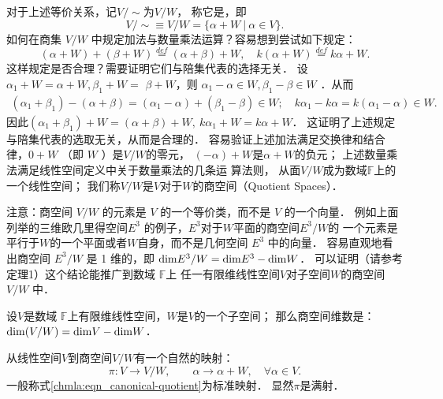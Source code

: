 对于上述等价关系，记$V / \sim$为$V / W$，
称它是，即
\begin{equation}\label{chmla:eqn_Quotient}
    V / \sim \equiv V / W=\{\alpha+W \ |\ \alpha \in V \} .
\end{equation}
如何在商集 $V / W$ 中规定加法与数量乘法运算？容易想到尝试如下规定：
\begin{equation}\label{chmla:eqn_abwlin}
    (\alpha+W)+(\beta+W) \stackrel{def}{=}(\alpha+\beta)+W, \quad
    k(\alpha+W) \stackrel{def}{=} k \alpha+W .
\end{equation}
这样规定是否合理？需要证明它们与陪集代表的选择无关．
设$\alpha_1+W=\alpha+W, \beta_1+W=$ $\beta+W$，则 $\alpha_1-\alpha \in W, \beta_1-\beta \in W$ ．从而
\begin{align*}
    (\alpha_1+\beta_1)-(\alpha+\beta)= (\alpha_1-\alpha)+(\beta_1-\beta) \in W; \quad
    k \alpha_1-k \alpha= k (\alpha_1-\alpha) \in W .
\end{align*}
因此$(\alpha_1+\beta_1)+W=(\alpha+\beta)+W,\ k \alpha_1+W=k \alpha+W$．
这证明了上述规定与陪集代表的选取无关，从而是合理的．
容易验证上述加法满足交换律和结合律，$0+W$ （即 $W$ ）是$V / W$的{\kaishu 零元}，
$(-\alpha)+W$是$\alpha+W$的{\kaishu 负元}；
上述数量乘法满足线性空间定义中关于数量乘法的几条运 算法则，
从面$V / W$成为数域$\mathbb{F}$上的一个线性空间；
我们称$V / W$是$V$对于$W$的{\heiti 商空间}（Quotient Spaces）．

注意：商空间 $V / W$ 的元素是 $V$ 的一个等价类，而不是 $V$ 的一个向量．
例如上面列举的三维欧几里得空间$E^3$ 的例子，$E^3$对于$W$平面的商空间$E^3 / W$的
一个元素是平行于$W$的一个平面或者$W$自身，而不是几何空间 $E^3$ 中的向量．
容易直观地看出商空间 $E^3 / W$ 是 1 维的，即 ${\rm dim}E^3 / W={\rm dim} E^3-{\rm dim} W$．
可以证明（请参考\parencite[p.219]{qiuws-2019-v2}定理1）这个结论能推广到数域 $\mathbb{F}$上
任一有限维线性空间$V$对子空间$W$的商空间$V / W$ 中．

\begin{theorem}\label{chmla:thm_dimvw}
    设$V$是数域 $\mathbb{F}$上有限维线性空间，$W$是$V$的一个子空间；
    那么商空间维数是：$ {\rm dim} (V / W)={\rm dim} V-{\rm dim} W$．
\end{theorem}


从线性空间$V$到商空间$V/W$有一个自然的映射：
\begin{equation}\label{chmla:eqn_canonical-quotient}
    \pi: V \to V/W,\qquad  \alpha \to \alpha + W, \quad \forall\alpha\in V.
\end{equation}
一般称式\eqref{chmla:eqn_canonical-quotient}为{\heiti 标准映射}．
显然$\pi$是满射．




